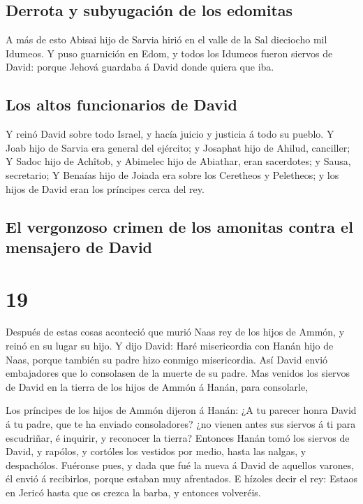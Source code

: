 \hypertarget{derrota-y-subyugaciuxf3n-de-los-edomitas}{%
\subsection{Derrota y subyugación de los
edomitas}\label{derrota-y-subyugaciuxf3n-de-los-edomitas}}

 A más de esto Abisai hijo de Sarvia hirió en el valle de
la Sal dieciocho mil Idumeos.  Y puso guarnición en Edom, y
todos los Idumeos fueron siervos de David: porque Jehová guardaba á
David donde quiera que iba.

\hypertarget{los-altos-funcionarios-de-david}{%
\subsection{Los altos funcionarios de
David}\label{los-altos-funcionarios-de-david}}

 Y reinó David sobre todo Israel, y hacía juicio y justicia
á todo su pueblo.  Y Joab hijo de Sarvia era general del
ejército; y Josaphat hijo de Ahilud, canciller;  Y Sadoc
hijo de Achîtob, y Abimelec hijo de Abiathar, eran sacerdotes; y Sausa,
secretario;  Y Benaías hijo de Joiada era sobre los
Ceretheos y Peletheos; y los hijos de David eran los príncipes cerca del
rey.

\hypertarget{el-vergonzoso-crimen-de-los-amonitas-contra-el-mensajero-de-david}{%
\subsection{El vergonzoso crimen de los amonitas contra el mensajero de
David}\label{el-vergonzoso-crimen-de-los-amonitas-contra-el-mensajero-de-david}}

\hypertarget{section-18}{%
\section{19}\label{section-18}}

 Después de estas cosas aconteció que murió Naas rey de los
hijos de Ammón, y reinó en su lugar su hijo.  Y dijo David:
Haré misericordia con Hanán hijo de Naas, porque también su padre hizo
conmigo misericordia. Así David envió embajadores que lo consolasen de
la muerte de su padre. Mas venidos los siervos de David en la tierra de
los hijos de Ammón á Hanán, para consolarle,

 Los príncipes de los hijos de Ammón dijeron á Hanán: ¿A tu
parecer honra David á tu padre, que te ha enviado consoladores? ¿no
vienen antes sus siervos á ti para escudriñar, é inquirir, y reconocer
la tierra?  Entonces Hanán tomó los siervos de David, y
rapólos, y cortóles los vestidos por medio, hasta las nalgas, y
despachólos.  Fuéronse pues, y dada que fué la nueva á David
de aquellos varones, él envió á recibirlos, porque estaban muy
afrentados. E hízoles decir el rey: Estaos en Jericó hasta que os crezca
la barba, y entonces volveréis.

